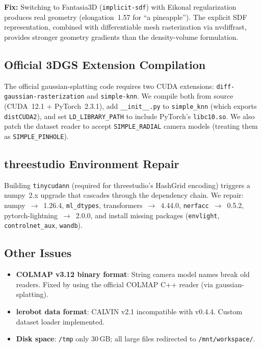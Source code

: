 \documentclass[10pt,twocolumn,letterpaper]{article}
\begin{document}
\textbf{Fix:} Switching to Fantasia3D (\texttt{implicit-sdf}) with Eikonal regularization produces real geometry (elongation~1.57 for ``a pineapple''). The explicit SDF representation, combined with differentiable mesh rasterization via nvdiffrast, provides stronger geometry gradients than the density-volume formulation.

\subsection{Official 3DGS Extension Compilation}

The official gaussian-splatting code requires two CUDA extensions: \texttt{diff-gaussian-rasterization} and \texttt{simple-knn}. We compile both from source (CUDA~12.1 + PyTorch~2.3.1), add \texttt{\_\_init\_\_.py} to \texttt{simple\_knn} (which exports \texttt{distCUDA2}), and set \texttt{LD\_LIBRARY\_PATH} to include PyTorch's \texttt{libc10.so}. We also patch the dataset reader to accept \texttt{SIMPLE\_RADIAL} camera models (treating them as \texttt{SIMPLE\_PINHOLE}).

\subsection{threestudio Environment Repair}

Building \texttt{tinycudann} (required for threestudio's HashGrid encoding) triggers a numpy~2.x upgrade that cascades through the dependency chain. We repair: numpy~$\to$~1.26.4, \texttt{ml\_dtypes}, transformers~$\to$~4.44.0, \texttt{nerfacc}~$\to$~0.5.2, pytorch-lightning~$\to$~2.0.0, and install missing packages (\texttt{envlight}, \texttt{controlnet\_aux}, \texttt{wandb}).

\subsection{Other Issues}
\begin{itemize}
\item \textbf{COLMAP v3.12 binary format}: String camera model names break old readers. Fixed by using the official COLMAP C++ reader (via gaussian-splatting).
\item \textbf{lerobot data format}: CALVIN v2.1 incompatible with v0.4.4. Custom dataset loader implemented.
\item \textbf{Disk space}: \texttt{/tmp} only 30\,GB; all large files redirected to \texttt{/mnt/workspace/}.
\end{itemize}
\end{document}
